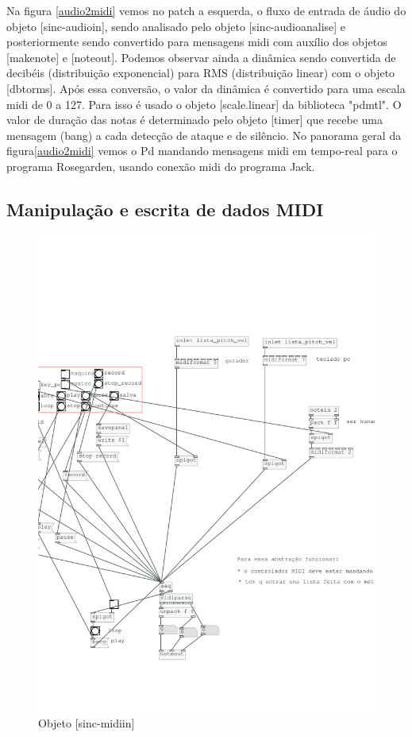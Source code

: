 \documentclass{ppgmus}
\begin{document}
Na figura \ref{audio2midi} vemos no patch a esquerda, o fluxo de entrada de áudio do objeto
[sinc-audioin], sendo analisado pelo objeto [sinc-audioanalise] e posteriormente
sendo convertido para mensagens midi com auxílio dos objetos [makenote] e [noteout].
Podemos observar ainda a dinâmica sendo convertida de decibéis (distribuição exponencial)
 para RMS (distribuição linear) com o objeto [dbtorms]. Após essa conversão,
o valor da dinâmica é convertido para uma escala midi de 0 a 127. Para isso é usado
o objeto [scale.linear] da biblioteca "pdmtl". O valor de duração das notas é determinado
pelo objeto [timer] que recebe uma mensagem (bang) a cada detecção de ataque e de silêncio.
No panorama geral da figura\ref{audio2midi} vemos o Pd mandando mensagens midi em tempo-real
para o programa Rosegarden, usando conexão midi do programa Jack. 



\subsection{Manipulação e escrita de dados MIDI}

% 

\begin{figure}
\includegraphics[scale=.5]{sinc-midiin}
\caption{Objeto [sinc-midiin]}
\label{sinc-midiin}
\end{figure}
\end{document}
